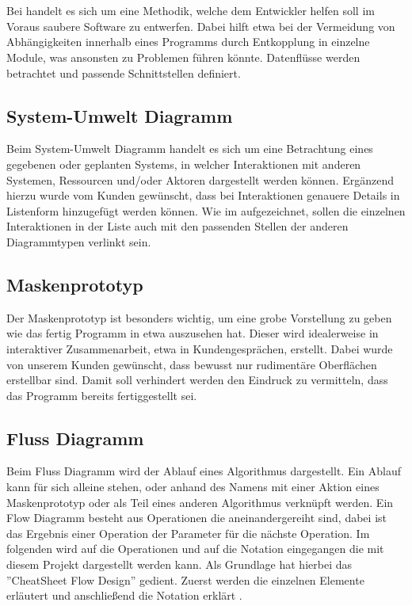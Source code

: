 
\section{\textFlowDesign}

Bei \textFlowDesign{} handelt es sich um eine Methodik, welche dem Entwickler helfen soll
im Voraus saubere Software zu entwerfen. Dabei hilft \textFlowDesign{} etwa bei der
Vermeidung von Abhängigkeiten innerhalb eines Programms durch Entkopplung in einzelne
Module, was ansonsten zu Problemen führen könnte.
Datenflüsse werden betrachtet und passende Schnittstellen definiert.

\subsection{System-Umwelt Diagramm}
Beim System-Umwelt Diagramm handelt es sich um eine Betrachtung eines gegebenen oder geplanten Systems, in welcher Interaktionen mit anderen Systemen, Ressourcen und/oder Aktoren dargestellt werden können. Ergänzend hierzu wurde vom Kunden gewünscht, dass bei Interaktionen genauere Details in Listenform hinzugefügt werden können.
Wie im  aufgezeichnet, sollen die einzelnen Interaktionen in der Liste auch mit den passenden Stellen der anderen Diagrammtypen verlinkt sein.


\subsection{Maskenprototyp}
Der Maskenprototyp ist besonders wichtig, um eine grobe Vorstellung zu geben wie das fertig Programm in etwa auszusehen hat. Dieser wird idealerweise in interaktiver Zusammenarbeit, etwa in Kundengesprächen, erstellt. Dabei wurde von unserem Kunden gewünscht, dass bewusst nur rudimentäre Oberflächen erstellbar sind. Damit soll verhindert werden den Eindruck zu vermitteln, dass das Programm bereits fertiggestellt sei.

\subsection{Fluss Diagramm}

Beim Fluss Diagramm wird der Ablauf eines Algorithmus dargestellt. Ein Ablauf kann für sich alleine stehen, oder
anhand des Namens mit einer Aktion eines Maskenprototyp oder als Teil eines anderen Algorithmus verknüpft werden.
Ein Flow Diagramm besteht aus Operationen die aneinandergereiht sind, dabei ist das Ergebnis einer Operation der
Parameter für die nächste Operation.
Im folgenden wird auf die Operationen und auf die Notation eingegangen die mit diesem Projekt dargestellt werden kann.
Als Grundlage hat hierbei das ''CheatSheet Flow Design''\cite{flowDesign} gedient. Zuerst werden die einzelnen
Elemente erläutert  und anschließend die Notation erklärt
.

